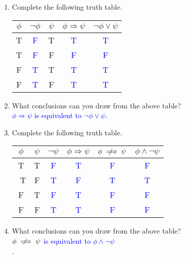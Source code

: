 \documentclass[13.5pt]{article}
\newcommand{\notimplies}{%
  \mathrel{{\ooalign{\hidewidth$\not\phantom{=}$\hidewidth\cr$\implies$}}}}
\begin{document}
\begin{enumerate}
\item{Complete the following truth table.}

\begin{center}
\begin{tabular}{ c c c c c}
 \(\phi\) & \(\neg \phi\) & \(\psi\) & \(\phi \Rightarrow \psi\) & \(\neg \phi \vee \psi\)\\ 
\hline
 T & \textcolor{blue}{F} & T & \textcolor{blue}{T} & \textcolor{blue}{T}\\ 
 T & \textcolor{blue}{F} & F & \textcolor{blue}{F} & \textcolor{blue}{F}\\  
 F & \textcolor{blue}{T} & T & \textcolor{blue}{T} & \textcolor{blue}{T}\\   
 F & \textcolor{blue}{T} & F & \textcolor{blue}{T} & \textcolor{blue}{T}
\end{tabular}
\end{center}

\item{What conclusions can you draw from the above table?}\\
\textcolor{blue}{\(\phi \Rightarrow \psi\) is equivalent to \(\neg \phi \vee \psi\).}

\item{Complete the following truth table.}

\begin{center}
\begin{tabular}{ c c c c c c}
 \(\phi\) & \(\psi\) & \(\neg \psi\) & \(\phi \Rightarrow \psi\) & \(\phi \notimplies \psi\) & \(\phi \wedge \neg \psi\)\\ 
\hline
 T & T & \textcolor{blue}{F} & \textcolor{blue}{T} & \textcolor{blue}{F} & \textcolor{blue}{F}\\\ 
 T & F & \textcolor{blue}{T} & \textcolor{blue}{F} & \textcolor{blue}{T} & \textcolor{blue}{T}\\  
 F & T & \textcolor{blue}{F} & \textcolor{blue}{T} & \textcolor{blue}{F} & \textcolor{blue}{F}\\   
 F & F & \textcolor{blue}{T} & \textcolor{blue}{T} & \textcolor{blue}{F} & \textcolor{blue}{F}
\end{tabular}
\end{center}

\item{What conclusions can you draw from the above table?}\\
\textcolor{blue}{\(\phi \notimplies \psi\) is equivalent to \(\phi \wedge \neg \psi\)\\ .}


\end{enumerate}
\end{document}

